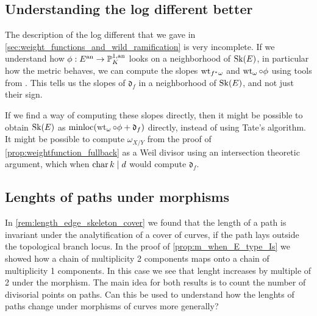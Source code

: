 \subsection*{Understanding the log different better} \label{sec:understanding_the_log_different_better}
The description of the log different that we gave in \cref{sec:weight_functions_and_wild_ramification} is very incomplete. 
If we understand how $\phi: E\an \to \pro^{1, \text{an}}_K$ looks on a neighborhood of $\operatorname{Sk}(E)$, in particular how the metric behaves, we can compute the slopes $\operatorname{wt}_{f^*\omega}$ and $\wt_{\omega} \circ \phi$ using tools from \cite{bakerWeightFunctionsBerkovich2016}. 
This tells us the slopes of $\mathfrak{d}_f $ in a neighborhood of $\operatorname{Sk}(E)$, and not just their sign. 


If we find a way of computing these slopes directly, then it might be possible to obtain  $\operatorname{Sk}(E)$ as $\minloc (\wt_{\omega} \circ \phi + \mathfrak{d}_f)$ directly, instead of using Tate's algorithm. 
It might be possible to compute $\omega_{X / Y}$ from the proof of \cref{prop:weightfunction_fullback} as a Weil divisor using an intersection theoretic argument, which when $\operatorname{char} k \mid d$ would compute  $\mathfrak{d} _f$. 


\subsection*{Lenghts of paths under morphisms} \label{sec:lenghts_of_paths_under_morphisms}

In \cref{rem:length_edge_skeleton_cover} we found that the length of a path is invariant under the analytification of a cover of curves, if the path lays outside the topological branch locus. 
In the proof of \cref{prop:m_when_E_type_Is} we showed how a chain of multiplicity 2 components maps onto a chain of multiplicity 1 components. In this case we see that lenght increases by multiple of 2 under the morphism. 
The main idea for both results is to count the number of divisorial points on paths. Can this be used to understand how the lenghts of paths change under morphisms of curves more generally?
